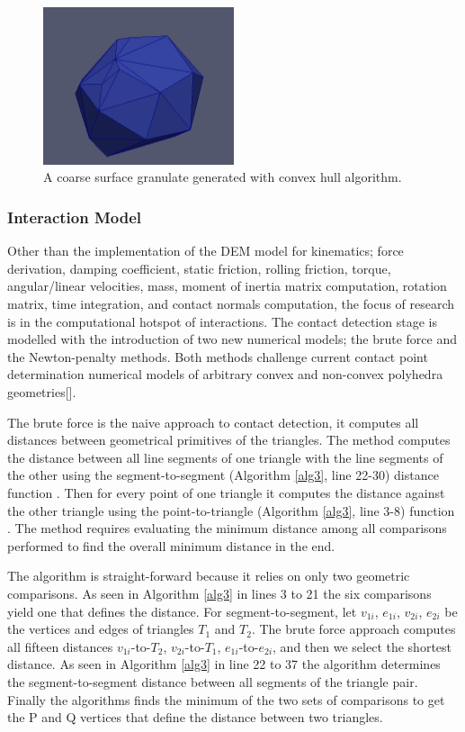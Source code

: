 \documentclass[times,12pt]{article}
\begin{document}
\begin{figure}[!h]
\centering
\includegraphics[width=0.5\textwidth]{sketches/coarse.png} \protect\caption{\label{granulate} A coarse surface granulate generated with convex hull algorithm.}
\end{figure} 


\subsubsection{Interaction Model}

Other than the implementation of the DEM model for kinematics; force derivation, damping coefficient, static friction, rolling friction, torque, angular/linear velocities, mass, moment of inertia matrix computation, rotation matrix, time integration, and contact normals computation, the focus of research is in the computational hotspot of interactions. The contact detection stage is modelled with the introduction of two new numerical models; the brute force and the Newton-penalty methods. Both methods challenge current contact point determination numerical models of arbitrary convex and non-convex polyhedra geometries[]. 

The brute force is the naive approach to contact detection, it computes all distances between geometrical primitives of the triangles. The method computes the distance between all line segments of one triangle with the line segments of the other using the segment-to-segment (Algorithm \ref{alg3}, line 22-30) distance function \cite{Ericson2005, Tropp2006}. Then for every point of one triangle it computes the distance against the other triangle using the point-to-triangle (Algorithm \ref{alg3}, line 3-8) function \cite{Eberly1999, Ericson2005}. The method requires evaluating the minimum distance among all comparisons performed to find the overall minimum distance in the end.

The algorithm is straight-forward because it relies on only two geometric comparisons. As seen in Algorithm \ref{alg3} in lines 3 to 21 the six comparisons yield one that defines the distance. For segment-to-segment, let $v_{1i}$, $e_{1i}$, $v_{2i}$, $e_{2i}$ be the vertices and edges of triangles $T_1$ and $T_2$. The brute force approach computes all fifteen distances $v_{1i}$-to-$T_2$, $v_{2i}$-to-$T_1$, $e_{1i}$-to-$e_{2i}$, and then we select the shortest distance. As seen in Algorithm \ref{alg3} in line 22 to 37 the algorithm determines the segment-to-segment distance between all segments of the triangle pair. Finally the algorithms finds the minimum of the two sets of comparisons to get the P and Q vertices that define the distance between two triangles. 
\end{document}
